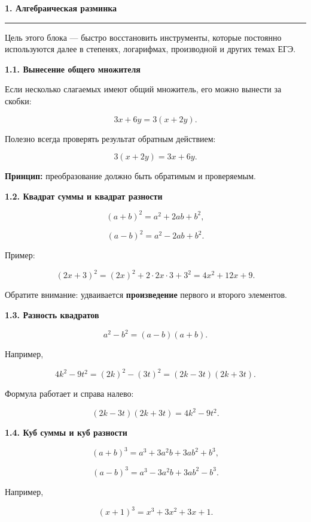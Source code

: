 \documentclass[a4paper,12pt]{article}
\newcommand{\MainSection}[1]{%
  \vspace{0.7em}
  {\Large\bfseries\color{darkaccent}#1\par}
  \vspace{0.25em}
  {\color{accent}\rule{\linewidth}{0.6pt}}
  \vspace{0.5em}
}
\newcommand{\SubSection}[1]{%
  \vspace{0.5em}
  {\large\bfseries\color{accent}#1\par}
  \vspace{0.2em}
}
\newcommand{\important}[1]{\textbf{\color{darkaccent}#1}}
\begin{document}

\MainSection{1. Алгебраическая разминка}

Цель этого блока --- быстро восстановить инструменты, которые постоянно
используются далее в степенях, логарифмах, производной и других темах ЕГЭ.

\SubSection{1.1. Вынесение общего множителя}

Если несколько слагаемых имеют общий множитель, его можно вынести за скобки:

\[
3x+6y=3(x+2y).
\]

Полезно всегда проверять результат обратным действием:

\[
3(x+2y)=3x+6y.
\]

\important{Принцип:} преобразование должно быть обратимым и проверяемым.


\SubSection{1.2. Квадрат суммы и квадрат разности}

\[
(a+b)^2=a^2+2ab+b^2,
\]

\[
(a-b)^2=a^2-2ab+b^2.
\]

Пример:

\[
(2x+3)^2
=
(2x)^2+2\cdot 2x\cdot 3+3^2
=
4x^2+12x+9.
\]

Обратите внимание: удваивается \important{произведение} первого и второго
элементов.


\SubSection{1.3. Разность квадратов}

\[
a^2-b^2=(a-b)(a+b).
\]

Например,

\[
4k^2-9t^2
=
(2k)^2-(3t)^2
=
(2k-3t)(2k+3t).
\]

Формула работает и справа налево:

\[
(2k-3t)(2k+3t)=4k^2-9t^2.
\]


\SubSection{1.4. Куб суммы и куб разности}

\[
(a+b)^3
=
a^3+3a^2b+3ab^2+b^3,
\]

\[
(a-b)^3
=
a^3-3a^2b+3ab^2-b^3.
\]

Например,

\[
(x+1)^3=x^3+3x^2+3x+1.
\]
\end{document}
